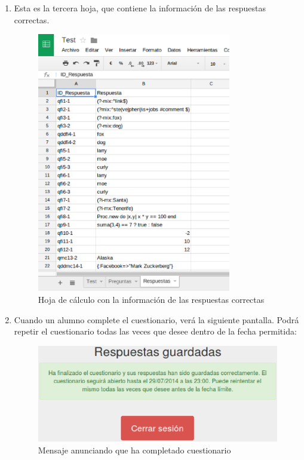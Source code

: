 \begin{enumerate}
  \item Esta es la tercera hoja, que contiene la informaci\'on de las respuestas correctas.
  \begin{figure}[!th]
  \begin{center}
  \includegraphics[width=0.8\textwidth]{images/app13.eps}
  \caption{Hoja de c\'alculo con la informaci\'on de las respuestas correctas}
  \label{fig:app13}
  \end{center}
  \end{figure}
  \newpage

  \item Cuando un alumno complete el cuestionario, ver\'a la siguiente pantalla. Podr\'a repetir el cuestionario todas las veces que desee dentro de la
  fecha permitida:
  \begin{figure}[!th]
  \begin{center}
  \includegraphics[width=1\textwidth]{images/app14.eps}
  \caption{Mensaje anunciando que ha completado cuestionario}
  \label{fig:app14}
  \end{center}
  \end{figure}
  \newpage
  

\end{enumerate}
